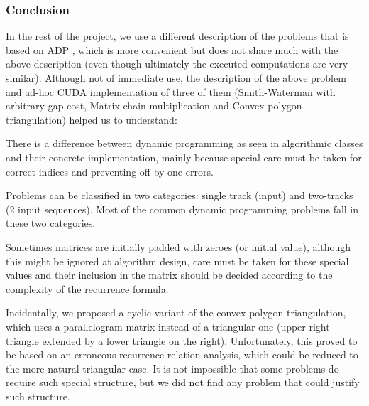 \subsubsection{Conclusion}
In the rest of the project, we use a different description of the problems that is based on ADP \cite{adp}, which is more convenient but does not share much with the above description (even though ultimately the executed computations are very similar). Although not of immediate use, the description of the above problem and ad-hoc CUDA implementation of three of them (Smith-Waterman with arbitrary gap cost, Matrix chain multiplication and Convex polygon triangulation) helped us to understand:\ol
\item There is a difference between dynamic programming as seen in algorithmic classes and their concrete implementation, mainly because special care must be taken for correct indices and preventing off-by-one errors.
\item Problems can be classified in two categories: single track (input) and two-tracks (2 input sequences). Most of the common dynamic programming problems fall in these two categories.
\item Sometimes matrices are initially padded with zeroes (or initial value), although this might be ignored at algorithm design, care must be taken for these special values and their inclusion in the matrix should be decided according to the complexity of the recurrence formula.
\item Incidentally, we proposed a cyclic variant of the convex polygon triangulation, which uses a parallelogram matrix instead of a triangular one (upper right triangle extended by a lower triangle on the right). Unfortunately, this proved to be based on an erroneous recurrence relation analysis, which could be reduced to the more natural triangular case. It is not impossible that some problems do require such special structure, but we did not find any problem that could justify such structure. 
\ole
